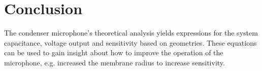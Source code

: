\documentclass[journal]{IEEEtran}
\begin{document}



\section{Conclusion}

The condenser microphone's theoretical analysis yields expressions for the system capacitance, voltage output and sensitivity based on geometries. These equations can be used to gain insight about how to improve the operation of the microphone, e.g. increased the membrane radius to increase sensitivity. 






%


\end{document}

